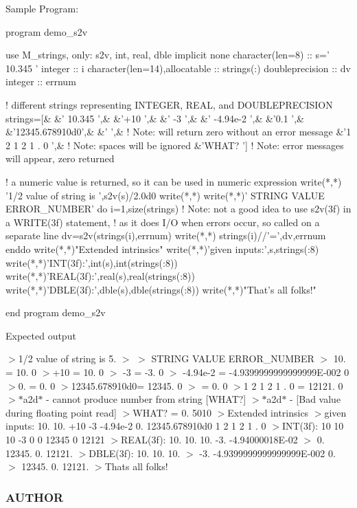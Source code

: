 Sample Program\+: \begin{DoxyVerb} program demo_s2v

 use M_strings, only: s2v, int, real, dble
 implicit none
 character(len=8)              :: s=' 10.345 '
 integer                       :: i
 character(len=14),allocatable :: strings(:)
 doubleprecision               :: dv
 integer                       :: errnum

 ! different strings representing INTEGER, REAL, and DOUBLEPRECISION
 strings=[&
 &' 10.345       ',&
 &'+10           ',&
 &'    -3        ',&
 &'    -4.94e-2  ',&
 &'0.1           ',&
 &'12345.678910d0',&
 &'              ',& ! Note: will return zero without an error message
 &'1 2 1 2 1 . 0 ',& ! Note: spaces will be ignored
 &'WHAT?         ']  ! Note: error messages will appear, zero returned

 ! a numeric value is returned, so it can be used in numeric expression
 write(*,*) '1/2 value of string is ',s2v(s)/2.0d0
 write(*,*)
 write(*,*)' STRING            VALUE                    ERROR_NUMBER'
 do i=1,size(strings)
    ! Note: not a good idea to use s2v(3f) in a WRITE(3f) statement,
    ! as it does I/O when errors occur, so called on a separate line
    dv=s2v(strings(i),errnum)
    write(*,*) strings(i)//'=',dv,errnum
 enddo
 write(*,*)"Extended intrinsics"
 write(*,*)'given inputs:',s,strings(:8)
 write(*,*)'INT(3f):',int(s),int(strings(:8))
 write(*,*)'REAL(3f):',real(s),real(strings(:8))
 write(*,*)'DBLE(3f):',dble(s),dble(strings(:8))
 write(*,*)"That's all folks!"

 end program demo_s2v
\end{DoxyVerb}


Expected output

$>$1/2 value of string is 5. $>$ $>$ S\+T\+R\+I\+NG V\+A\+L\+UE E\+R\+R\+O\+R\+\_\+\+N\+U\+M\+B\+ER $>$ 10. = 10. 0 $>$+10 = 10. 0 $>$ -\/3 = -\/3. 0 $>$ -\/4.\+94e-\/2 = -\/4.\+9399999999999999E-\/002 0 $>$0. = 0. 0 $>$12345.\+678910d0= 12345. 0 $>$ = 0. 0 $>$1 2 1 2 1 . 0 = 12121. 0 $>$$\ast$a2d$\ast$ -\/ cannot produce number from string \mbox{[}W\+H\+AT?\mbox{]} $>$$\ast$a2d$\ast$ -\/ \mbox{[}Bad value during floating point read\mbox{]} $>$W\+H\+AT? = 0. 5010 $>$Extended intrinsics $>$given inputs\+: 10. 10. +10 -\/3 -\/4.\+94e-\/2 0. 12345.\+678910d0 1 2 1 2 1 . 0 $>$I\+N\+T(3f)\+: 10 10 10 -\/3 0 0 12345 0 12121 $>$R\+E\+A\+L(3f)\+: 10. 10. 10. -\/3. -\/4.\+94000018E-\/02 $>$ 0. 12345. 0. 12121. $>$D\+B\+L\+E(3f)\+: 10. 10. 10. $>$ -\/3. -\/4.\+9399999999999999E-\/002 0. $>$ 12345. 0. 12121. $>$That\textquotesingle{}s all folks! \subsubsection*{A\+U\+T\+H\+OR}

